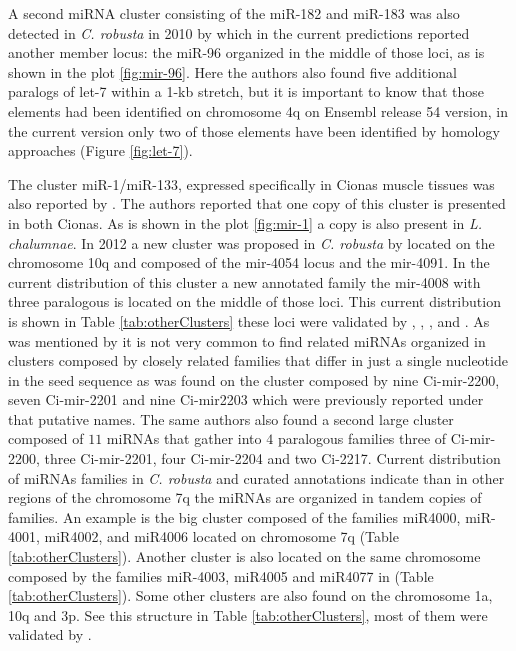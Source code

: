 \documentclass[graybox]{svmult}
\begin{document}
A second miRNA cluster consisting of the miR-182 and miR-183 was also detected 
in \textit{C. robusta} in 2010 by \citet{Keshavan2010} which in the 
current predictions reported another member locus: the miR-96 organized in 
the middle of those loci, as is shown in the plot \ref{fig:mir-96}. 
Here the authors also found five additional paralogs of let-7 within a 1-kb 
stretch, but it is important to know that those elements had been identified on 
chromosome 4q on Ensembl release 54 version, in the current version only 
two of those elements have been identified by homology approaches (Figure 
\ref{fig:let-7}).

The cluster miR-1/miR-133, expressed specifically in Cionas muscle tissues
was also reported by \citet{Kusakabe2013}. The authors reported that one
copy of this cluster is presented in both Cionas. As is shown in the plot
\ref{fig:mir-1} a copy is also present in \textit{L. chalumnae}. In 2012 a
new cluster was proposed in \textit{C. robusta} by \citet{Terai2012}
located on the chromosome 10q and composed of the mir-4054 locus and the
mir-4091. In the current distribution of this cluster a new annotated
family the mir-4008 with three paralogous is located on the middle of those
loci. This current distribution is shown in Table \ref{tab:otherClusters}
these loci were validated by \citet{Norden-Krichmar2007}, \citet{Fu:08},
\citet{Hendrix2010}, and \citet{Terai2012}. As was mentioned by
\citet{Hendrix2010} it is not very common to find related miRNAs organized
in clusters composed by closely related families that differ in just a
single nucleotide in the seed sequence as was found on the cluster composed
by nine Ci-mir-2200, seven Ci-mir-2201 and nine Ci-mir2203 which were
previously reported under that putative names.  The same authors also found a
second large cluster composed of $11$ miRNAs that gather into $4$
paralogous families three of Ci-mir-2200, three Ci-mir-2201, four
Ci-mir-2204 and two Ci-2217. Current distribution of miRNAs families in
\textit{C. robusta} and curated annotations indicate than in other regions
of the chromosome 7q the miRNAs are organized in tandem copies of
families. An example is the big cluster composed of the families miR4000,
miR-4001, miR4002, and miR4006 located on chromosome 7q (Table
\ref{tab:otherClusters}). Another cluster is also located on the same
chromosome composed by the families miR-4003, miR4005 and miR4077 in (Table
\ref{tab:otherClusters}). Some other clusters are also found on the chromosome 1a, 10q and 3p. See this structure in Table \ref{tab:otherClusters}, most of them were validated by \citet{Hendrix2010}.
\end{document}
